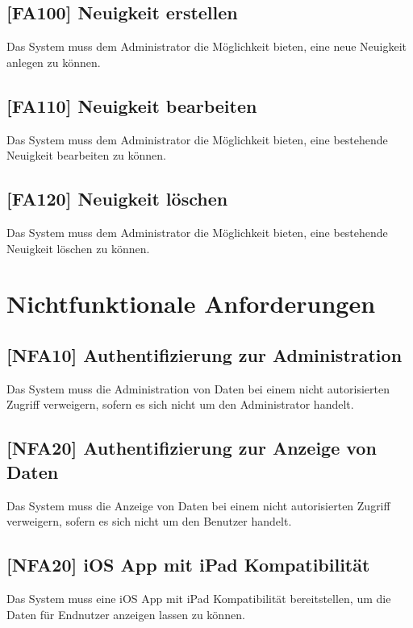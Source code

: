 \subsection{[FA100] Neuigkeit erstellen} \label{fa100}
Das System muss dem Administrator die Möglichkeit bieten, eine neue Neuigkeit anlegen zu können.

\subsection{[FA110] Neuigkeit bearbeiten} \label{fa110}
Das System muss dem Administrator die Möglichkeit bieten, eine bestehende Neuigkeit bearbeiten zu können.

\subsection{[FA120] Neuigkeit löschen} \label{fa120}
Das System muss dem Administrator die Möglichkeit bieten, eine bestehende Neuigkeit löschen zu können.

\newpage

\section{Nichtfunktionale Anforderungen}

\subsection{[NFA10] Authentifizierung zur Administration} \label{nfa10}
Das System muss die Administration von Daten bei einem nicht autorisierten Zugriff verweigern, sofern es sich nicht um den Administrator handelt.

\subsection{[NFA20] Authentifizierung zur Anzeige von Daten} \label{nfa20}
Das System muss die Anzeige von Daten bei einem nicht autorisierten Zugriff verweigern, sofern es sich nicht um den Benutzer handelt.

\subsection{[NFA20] iOS App mit iPad Kompatibilität} \label{nfa30}
Das System muss eine iOS App mit iPad Kompatibilität bereitstellen, um die Daten für Endnutzer anzeigen lassen zu können.
